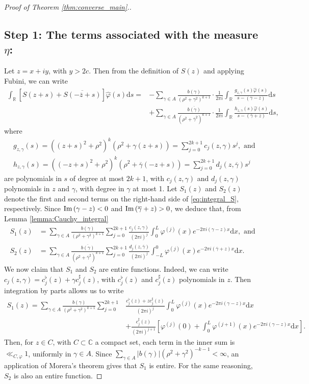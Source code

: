 \documentclass[a4paper,reqno,12pt]{amsart}
\renewcommand{\r}{\mathbb{R}}
\newcommand{\cp}{\mathbb{C}} %
\newcommand{\ft}{\widehat}
\newcommand{\ga}{\gamma}
\newcommand{\p}{\varphi}
\renewcommand{\d}{\mathrm{d}}
\newcommand{\ov}[1]{\overline{#1}}
\newcommand{\cd}{\cdot}
\newcommand{\1}{{\bf 1}}
\renewcommand{\Im}{{\rm Im}\,}
\begin{document}
\begin{proof}[Proof of Theorem \ref{thm:converse_main}.]
\subsection*{Step 1: The terms associated with the measure $\eta$:} Let $z=x+iy$, with $y>2c$. Then from the definition of $S(z)$ and applying Fubini, we can write
\begin{align}
\label{eq:integral_S}
    \int_{\r} \left[S(z+s)+\ov{S(-\ov{z}+s)}\right]\ft{\p}(s)\d s=&-\sum_{\ga\in A} \frac{b(\ga)}{(\rho^2+\ga^2)^{k+1}}\cd\frac{1}{2\pi i} \int_{\r} \frac{g_{z,\ga}(s)\ft{\p}(s)}{s-(\ga-z)}\d s\\
    &+\sum_{\ga\in A} \frac{\ov{b(\ga)}}{(\rho^2+\ov{\ga}^2)^{k+1}}\cd\frac{1}{2\pi i} \int_{\r} \frac{h_{z,\ga}(s)\ft{\p}(s)}{s-(\ov{\ga}+z)}\d s,
\end{align}
where
\begin{align*}
    &g_{z,\ga}(s)=\left((z+s)^2+\rho^2\right)^k\left(\rho^2+\ga(z+s)\right)=\sum_{j=0}^{2k+1} c_j(z,\ga)s^j, \text{ and }\\
    &h_{z,\ga}(s)=\left((-z+s)^2+\rho^2\right)^k\left(\rho^2+\ov{\ga}(-z+s)\right)=\sum_{j=0}^{2k+1} d_j(z,\ov{\ga})s^j
\end{align*}
are polynomials in $s$ of degree at most $2k+1$, with $c_j(z,\ga)$ and $d_j(z,\ga)$ polynomials in $z$ and $\ga$, with degree in $\ga$ at most 1. Let $S_1(z)$ and $S_2(z)$ denote the first and second terms on the right-hand side of \eqref{eq:integral_S}, respectively. Since $\Im{(\ga-z)}<0$ and $\Im{(\ov{\ga}+z)}>0$, we deduce that, from Lemma \eqref{lemma:Cauchy_integral}
\begin{align*}
    S_1(z)&=\sum_{\ga\in A} \frac{b(\ga)}{(\rho^2+\ga^2)^{k+1}}\sum_{j=0}^{2k+1} \frac{c_j(z,\ga)}{(2\pi i)^j} \int_{0}^{L} \p^{(j)}(x)e^{-2\pi i(\ga-z)x}\d x, \text{ and}\\
    S_2(z)&=\sum_{\ga\in A} \frac{\ov{b(\ga)}}{(\rho^2+\ov{\ga}^2)^{k+1}}\sum_{j=0}^{2k+1} \frac{d_j(z,\ov{\ga})}{(2\pi i)^j} \int_{-L}^{0} \p^{(j)}(x)e^{-2\pi i(\ov{\ga}+z)x}\d x.
\end{align*}
We now claim that $S_1$ and $S_2$ are entire functions. Indeed, we can write $c_j(z,\ga)=c_j^\flat(z)+\ga c_j^\sharp(z)$, with $c_j^\flat(z)$ and $c_j^\sharp(z)$ polynomials in $z$. Then integration by parts allows us to write
\begin{align*}
    S_1(z)=\sum_{\ga\in A} \frac{b(\ga)}{(\rho^2+\ga^2)^{k+1}}\sum_{j=0}^{2k+1} &\frac{c_j^\flat(z)+z c_j^\sharp(z)}{(2\pi i)^j} \int_{0}^{L} \p^{(j)}(x)e^{-2\pi i(\ga-z)x}\d x\\
    &+\frac{c_j^\sharp(z)}{(2\pi i)^{j+1}}\left[\p^{(j)}(0)+ \int_{0}^{L} \p^{(j+1)}(x)e^{-2\pi i(\ga-z)x}\d x\right].
\end{align*}
Then, for $z\in C$, with $C\subset\cp$ a compact set, each term in the inner sum is $\ll_{C,\p} 1$, uniformly in $\ga\in A$. Since $\sum_{\ga\in A} |b(\ga)|(\rho^2+\ga^2)^{-k-1}<\infty$, an application of Morera's theorem gives that $S_1$ is entire. For the same reasoning, $S_2$ is also an entire function.


\end{proof}
\end{document}
